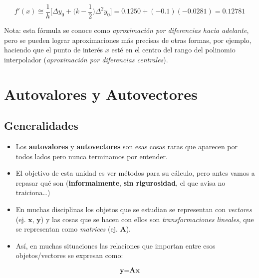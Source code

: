 \documentclass[openany]{book}
\providecommand{\tightlist}{%
  \setlength{\itemsep}{0pt}\setlength{\parskip}{0pt}}
\begin{document}
\[
f'(x) \cong \frac{1}{h} \Big[ \Delta y_0 + \Big( k-\frac{1}{2} \Big) \Delta^2 y_0 \Big] = 
 0.1250 + (-0.1) (-0.0281) = 0.12781
\]

Nota: esta fórmula se conoce como \emph{aproximación por diferencias hacia adelante}, pero se pueden lograr aproximaciones más precisas de otras formas, por ejemplo, haciendo que el punto de interés \(x\) esté en el centro del rango del polinomio interpolador (\emph{aproximación por diferencias centrales}).

\hypertarget{autovalores-y-autovectores}{%
\chapter{Autovalores y Autovectores}\label{autovalores-y-autovectores}}

\hypertarget{generalidades-3}{%
\section{Generalidades}\label{generalidades-3}}

\begin{itemize}
\tightlist
\item
  Los \textbf{autovalores} y \textbf{autovectores} son esas cosas raras que aparecen por todos lados pero nunca terminamos por entender.
\item
  El objetivo de esta unidad es ver métodos para su cálculo, pero antes vamos a repasar qué son (\textbf{informalmente}, \textbf{sin rigurosidad}, el que avisa no traiciona\ldots{})
\end{itemize}

\begin{itemize}
\tightlist
\item
  En muchas disciplinas los objetos que se estudian se representan con \emph{vectores} (ej. \(\textbf{x}\), \(\textbf{y}\)) y las cosas que se hacen con ellos son \emph{transformaciones lineales}, que se representan como \emph{matrices} (ej. \(\textbf{A}\)).
\item
  Así, en muchas situaciones las relaciones que importan entre esos objetos/vectores se expresan como:
\end{itemize}

\[\textbf{y} = \textbf{A} \textbf{x}\]
\end{document}
